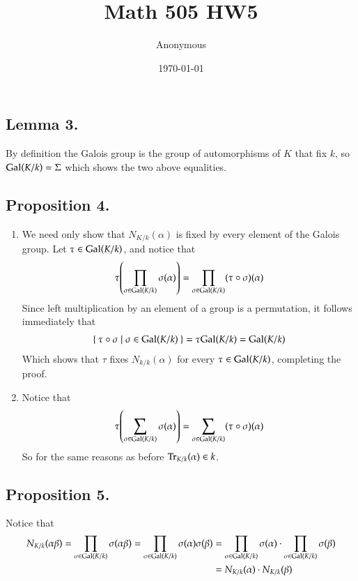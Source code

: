 \documentclass[12pt]{article}
\title{Math 505 HW5}
\date{\today}
\author{Anonymous}
\theoremstyle{definitionstyle}
\newcommand{\Gal}{\mathrm{Gal}\qty}
\begin{document}
	\maketitle
	\subsection*{Lemma 3.}
	By definition the Galois group is the group of automorphisms of $K$ that fix $k$, so $\Gal(K/k) = \Sigma$ which shows the two above equalities.
	
	\subsection*{Proposition 4.}
	\begin{enumerate}[label=(\arabic*)]
		\item We need only show that $N_{K/k}(\alpha)$ is fixed by every element of the Galois group. Let $\tau \in \Gal(K/k)$, and notice that
		\begin{align*}
			\tau\qty(\prod_{\sigma \in \Gal(K/k)} \sigma(\alpha)) = \prod_{\sigma \in \Gal(K/k)} (\tau \circ \sigma)(\alpha)
		\end{align*}
		Since left multiplication by an element of a group is a permutation, it follows immediately that 
		\begin{align*}
			\Set{\tau \circ \sigma \mid \sigma \in \Gal(K/k)} = \tau\Gal(K/k) = \Gal(K/k)
		\end{align*}
		Which shows that $\tau$ fixes $N_{k/k}(\alpha)$ for every $\tau \in \Gal(K/k)$, completing the proof.
		
		\item Notice that
		\begin{align*}
			\tau\qty(\sum_{\sigma \in \Gal(K/k)} \sigma(\alpha)) = \sum_{\sigma \in \Gal(K/k)} (\tau \circ \sigma)(\alpha)
		\end{align*}
		So for the same reasons as before $\Tr_{K/k}(\alpha) \in k$.
	\end{enumerate}

	\subsection*{Proposition 5.}
	Notice that
	\begin{align*}
		N_{K/k}(\alpha\beta) = \prod_{\sigma \in \Gal(K/k)} \sigma(\alpha\beta) = \prod_{\sigma \in \Gal(K/k)} \sigma(\alpha)\sigma(\beta) &= \prod_{\sigma \in \Gal(K/k)} \sigma(\alpha) \cdot \prod_{\sigma \in \Gal(K/k)} \sigma(\beta)
		\\&=N_{K/k}(\alpha) \cdot N_{K/k}(\beta)
	\end{align*}
\end{document}
